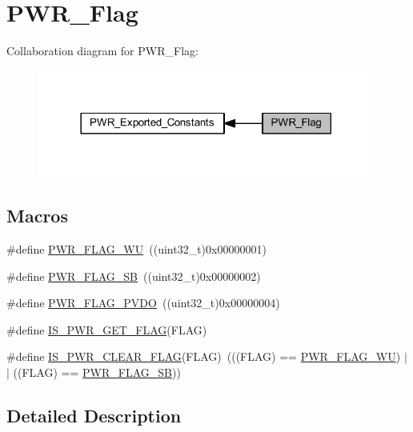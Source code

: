 \hypertarget{group___p_w_r___flag}{}\section{P\+W\+R\+\_\+\+Flag}
\label{group___p_w_r___flag}
Collaboration diagram for P\+W\+R\+\_\+\+Flag\+:
\nopagebreak
\begin{figure}[H]
\begin{center}
\leavevmode
\includegraphics[width=314pt]{group___p_w_r___flag}
\end{center}
\end{figure}
\subsection*{Macros}
\begin{DoxyCompactItemize}
\item 
\#define \hyperlink{group___p_w_r___flag_ga2d06760a5769e729b06d41e37036d58e}{P\+W\+R\+\_\+\+F\+L\+A\+G\+\_\+\+WU}~((uint32\+\_\+t)0x00000001)
\item 
\#define \hyperlink{group___p_w_r___flag_ga9e55f0b5dec2346d5c8dee3ab3c0c2df}{P\+W\+R\+\_\+\+F\+L\+A\+G\+\_\+\+SB}~((uint32\+\_\+t)0x00000002)
\item 
\#define \hyperlink{group___p_w_r___flag_gaefd05d58cc050eeef83a1b5c520b2c2a}{P\+W\+R\+\_\+\+F\+L\+A\+G\+\_\+\+P\+V\+DO}~((uint32\+\_\+t)0x00000004)
\item 
\#define \hyperlink{group___p_w_r___flag_gadc822638d0dd52d2f920808dd96c00a1}{I\+S\+\_\+\+P\+W\+R\+\_\+\+G\+E\+T\+\_\+\+F\+L\+AG}(F\+L\+AG)
\item 
\#define \hyperlink{group___p_w_r___flag_ga36d35a770e683e4a0baf3aac350fcb5a}{I\+S\+\_\+\+P\+W\+R\+\_\+\+C\+L\+E\+A\+R\+\_\+\+F\+L\+AG}(F\+L\+AG)~(((F\+L\+AG) == \hyperlink{group___p_w_r___flag_ga2d06760a5769e729b06d41e37036d58e}{P\+W\+R\+\_\+\+F\+L\+A\+G\+\_\+\+WU}) $\vert$$\vert$ ((F\+L\+AG) == \hyperlink{group___p_w_r___flag_ga9e55f0b5dec2346d5c8dee3ab3c0c2df}{P\+W\+R\+\_\+\+F\+L\+A\+G\+\_\+\+SB}))
\end{DoxyCompactItemize}


\subsection{Detailed Description}


